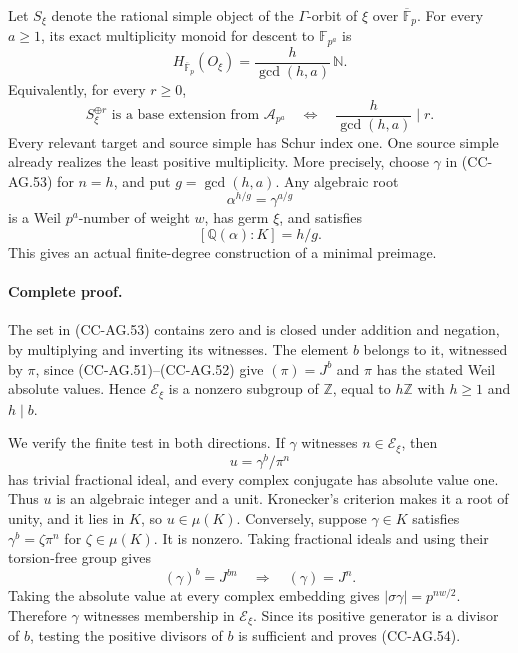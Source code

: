 Let \(S_\xi\) denote the rational simple object of the
\(\Gamma\)-orbit of \(\xi\) over
\(\overline{\mathbb F}_p\).  For every \(a\ge1\), its
exact multiplicity monoid for descent to \(\mathbb F_{p^a}\)
is
\[
 H_{\overline{\mathbb F}_p}(O_\xi)
                 =\frac{h}{\gcd(h,a)}\,\mathbb N.
                                                               \tag{CC-AG.55}
\]
Equivalently, for every \(r\ge0\),
\[
 S_\xi^{\oplus r}\text{ is a base extension from }
             \mathcal A_{p^a}
       \quad\Longleftrightarrow\quad
                  \frac{h}{\gcd(h,a)}\mid r.                 \tag{CC-AG.56}
\]
Every relevant target and source simple has Schur index one.
One source simple already realizes the least positive
multiplicity.  More precisely, choose \(\gamma\) in
(CC-AG.53) for \(n=h\), and put \(g=\gcd(h,a)\).
Any algebraic root
\[
                     \alpha^{h/g}=\gamma^{a/g}               \tag{CC-AG.57}
\]
is a Weil \(p^a\)-number of weight \(w\), has germ \(\xi\),
and satisfies
\[
                [\mathbb Q(\alpha):K]=h/g.                  \tag{CC-AG.58}
\]
This gives an actual finite-degree construction of a
minimal preimage.

\paragraph{Complete proof.}
The set in (CC-AG.53) contains zero and is closed under
addition and negation, by multiplying and inverting its
witnesses.  The element \(b\) belongs to it, witnessed
by \(\pi\), since (CC-AG.51)--(CC-AG.52) give
\((\pi)=J^b\) and \(\pi\) has the stated Weil absolute
values.  Hence \(\mathscr E_\xi\) is a nonzero subgroup
of \(\mathbb Z\), equal to \(h\mathbb Z\) with \(h\ge1\)
and \(h\mid b\).

We verify the finite test in both directions.
If \(\gamma\) witnesses \(n\in\mathscr E_\xi\), then
\[
                              u=\gamma^b/\pi^n
                                                               \tag{CC-AG.59}
\]
has trivial fractional ideal, and every complex conjugate
has absolute value one.  Thus \(u\) is an algebraic
integer and a unit.  Kronecker's criterion makes it
a root of unity, and it lies in \(K\), so
\(u\in\mu(K)\).  Conversely, suppose
\(\gamma\in K\) satisfies
\(\gamma^b=\zeta\pi^n\) for \(\zeta\in\mu(K)\).
It is nonzero.  Taking fractional ideals and using
their torsion-free group gives
\[
                    (\gamma)^b=J^{bn}
                       \quad\Longrightarrow\quad
                    (\gamma)=J^n.
 \]
Taking the absolute value at every complex embedding
gives \(|\sigma\gamma|=p^{nw/2}\).
Therefore \(\gamma\) witnesses membership in
\(\mathscr E_\xi\).  Since its positive generator is a
divisor of \(b\), testing the positive divisors of \(b\)
is sufficient and proves (CC-AG.54).


